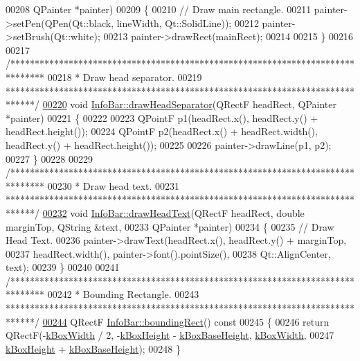 \begin{DoxyCode}
00208                                 QPainter *painter)
00209 \{
00210   \textcolor{comment}{// Draw main rectangle.}
00211   painter->setPen(QPen(Qt::black, lineWidth, Qt::SolidLine));
00212   painter->setBrush(Qt::white);
00213   painter->drawRect(mainRect);
00214 
00215 \}
00216 
00217 \textcolor{comment}{/*******************************************************************************}
00218 \textcolor{comment}{ * Draw head separator.}
00219 \textcolor{comment}{ ******************************************************************************/}
\hypertarget{infobar_8cpp_source_l00220}{}\hyperlink{class_info_bar_a9b89dc7229ecee097d9ca9c4e6fa38f2}{00220} \textcolor{keywordtype}{void} \hyperlink{class_info_bar_a9b89dc7229ecee097d9ca9c4e6fa38f2}{InfoBar::drawHeadSeparator}(QRectF headRect, QPainter *painter)
00221 \{
00222 
00223   QPointF p1(headRect.x(), headRect.y() + headRect.height());
00224   QPointF p2(headRect.x() + headRect.width(), headRect.y() + headRect.height());
00225 
00226   painter->drawLine(p1, p2);
00227 \}
00228 
00229 \textcolor{comment}{/*******************************************************************************}
00230 \textcolor{comment}{ * Draw head text.}
00231 \textcolor{comment}{ ******************************************************************************/}
\hypertarget{infobar_8cpp_source_l00232}{}\hyperlink{class_info_bar_a912f4b2babec3df1aad3d31bc54a6e34}{00232} \textcolor{keywordtype}{void} \hyperlink{class_info_bar_a912f4b2babec3df1aad3d31bc54a6e34}{InfoBar::drawHeadText}(QRectF headRect, \textcolor{keywordtype}{double} marginTop, QString &text,
00233                            QPainter *painter)
00234 \{
00235   \textcolor{comment}{// Draw Head Text.}
00236   painter->drawText(headRect.x(), headRect.y() + marginTop,
00237                     headRect.width(), painter->font().pointSize(),
00238                     Qt::AlignCenter, text);
00239 \}
00240 
00241 \textcolor{comment}{/*******************************************************************************}
00242 \textcolor{comment}{ * Bounding Rectangle.}
00243 \textcolor{comment}{ ******************************************************************************/}
\hypertarget{infobar_8cpp_source_l00244}{}\hyperlink{class_info_bar_a564aacb3b64bdb5fbcaef8a432a0b49e}{00244} QRectF \hyperlink{class_info_bar_a564aacb3b64bdb5fbcaef8a432a0b49e}{InfoBar::boundingRect}()\textcolor{keyword}{ const}
00245 \textcolor{keyword}{}\{
00246   \textcolor{keywordflow}{return} QRectF(-\hyperlink{class_info_bar_a58f7773f4265d7e759f2eeb4c9aac48d}{kBoxWidth} / 2, -\hyperlink{class_info_bar_aedf2e766968ea9ba3e691f24efb8c117}{kBoxHeight} - \hyperlink{class_info_bar_a0f2f7b614000ae1d317ec3819acabbf2}{kBoxBaseHeight}, 
      \hyperlink{class_info_bar_a58f7773f4265d7e759f2eeb4c9aac48d}{kBoxWidth},
00247                 \hyperlink{class_info_bar_aedf2e766968ea9ba3e691f24efb8c117}{kBoxHeight} + \hyperlink{class_info_bar_a0f2f7b614000ae1d317ec3819acabbf2}{kBoxBaseHeight});
00248 \}
\end{DoxyCode}
